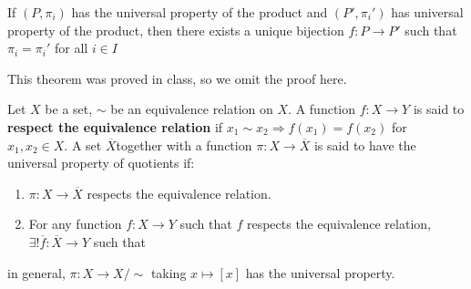 \documentclass[12pt, twosided]{article}
\begin{document}
\begin{thm}
  If \((P, \pi_i)\) has the universal property of the product and \((P\prime, \pi_i\prime)\) has universal property of the product, then there exists a unique bijection \(f: P \to P\prime\) such that \(\pi_i = \pi_i\prime\) for all \(i \in I\)

  \begin{center}
  \end{center}
\end{thm}

This theorem was proved in class, so we omit the proof here.

\begin{df}
  Let \(X\) be a set, \(\sim\) be an equivalence relation on \(X\). A function \(f: X \to Y\) is said to \textbf{respect the equivalence relation} if \(x_1 \sim x_2 \Rightarrow f(x_1) = f(x_2)\)  for \(x_1, x_2 \in X\). A set \(\overline{X}\)together with a function \(\pi: X \to \overline{X}\) is said to have the universal property of quotients if:
  \begin{enumerate}
  \item \(\pi: X \to \overline{X}\) respects the equivalence relation.
  \item For any function \(f: X \to Y\) such that \(f\) respects the equivalence relation, \(\exists! \overline{f}:\overline{X} \to Y\) such that

    \begin{center}
    \end{center}
  \end{enumerate}
\end{df}

\begin{exa}
  in general, \(\pi: X \to X/\sim\) taking \(x \mapsto [x]\) has the universal property.
\end{exa}
\end{document}
